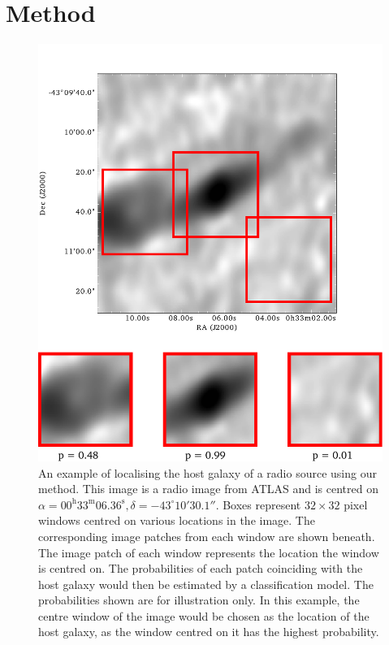 \documentclass[fleqn,usenatbib,usedcolumn]{mnras}
\begin{document}
  \section{Method}\label{sec:method}
    \begin{figure}
      \centering
      \includegraphics[width=\columnwidth]{images/elais_0093C1_with_boxes.pdf}
      \caption{An example of localising the host galaxy of a radio source using
        our method. This image is a radio image from ATLAS and is centred on
        $\alpha = 00^\text{h}33^\text{m}06.36^\text{s}, \delta =
        -43^\circ{}10'30.1''$. Boxes represent $32 \times 32$ pixel windows
        centred on various locations in the image. The corresponding image
        patches from each window are shown beneath. The image patch of each
        window represents the location the window is centred on. The
        probabilities of each patch coinciding with the host galaxy would then
        be estimated by a classification model. The probabilities shown are
        for illustration only. In this example, the centre window of the image
        would be chosen as the location of the host galaxy, as the window
        centred on it has the highest probability.}
      \label{fig:windows}
    \end{figure}
\end{document}
